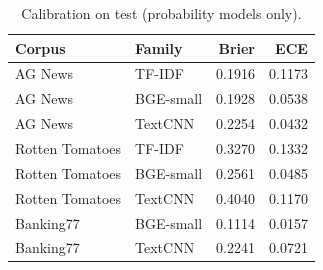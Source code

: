 \begin{table}[H]
\centering
\caption{Calibration on test (probability models only).}
\small
\begin{tabular}{@{}llrr@{}}
\toprule
Corpus & Family & Brier & ECE \\
\midrule
AG News & TF-IDF & 0.1916 & 0.1173 \\
AG News & BGE-small & 0.1928 & 0.0538 \\
AG News & TextCNN & 0.2254 & 0.0432 \\
Rotten Tomatoes & TF-IDF & 0.3270 & 0.1332 \\
Rotten Tomatoes & BGE-small & 0.2561 & 0.0485 \\
Rotten Tomatoes & TextCNN & 0.4040 & 0.1170 \\
Banking77 & BGE-small & 0.1114 & 0.0157 \\
Banking77 & TextCNN & 0.2241 & 0.0721 \\
\bottomrule
\end{tabular}
\end{table}
